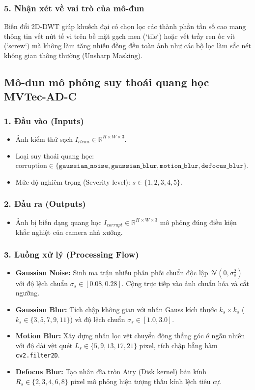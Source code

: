 \subsubsection*{5. Nhận xét về vai trò của mô-đun}
Biến đổi 2D-DWT giúp khuếch đại có chọn lọc các thành phần tần số cao mang thông tin vết nứt tế vi trên bề mặt gạch men (`tile`) hoặc vết trầy ren ốc vít (`screw`) mà không làm tăng nhiễu đồng đều toàn ảnh như các bộ lọc làm sắc nét không gian thông thường (Unsharp Masking).

\subsection{Mô-đun mô phỏng suy thoái quang học MVTec-AD-C}

\subsubsection*{1. Đầu vào (Inputs)}
\begin{itemize}
    \item Ảnh kiểm thử sạch $I_{clean} \in \mathbb{R}^{H \times W \times 3}$.
    \item Loại suy thoái quang học: $\text{corruption} \in \{\texttt{gaussian\_noise}, \texttt{gaussian\_blur}, \texttt{motion\_blur}, \texttt{defocus\_blur}\}$.
    \item Mức độ nghiêm trọng (Severity level): $s \in \{1, 2, 3, 4, 5\}$.
\end{itemize}

\subsubsection*{2. Đầu ra (Outputs)}
\begin{itemize}
    \item Ảnh bị biến dạng quang học $I_{corrupt} \in \mathbb{R}^{H \times W \times 3}$ mô phỏng đúng điều kiện khắc nghiệt của camera nhà xưởng.
\end{itemize}

\subsubsection*{3. Luồng xử lý (Processing Flow)}
\begin{itemize}
    \item \textbf{Gaussian Noise:} Sinh ma trận nhiễu phân phối chuẩn độc lập $\mathcal{N}(0, \sigma_s^2)$ với độ lệch chuẩn $\sigma_s \in [0.08, 0.28]$. Cộng trực tiếp vào ảnh chuẩn hóa và cắt ngưỡng.
    \item \textbf{Gaussian Blur:} Tích chập không gian với nhân Gauss kích thước $k_s \times k_s$ ($k_s \in \{3, 5, 7, 9, 11\}$) và độ lệch chuẩn $\sigma_s \in [1.0, 3.0]$.
    \item \textbf{Motion Blur:} Xây dựng nhân lọc vệt chuyển động thẳng góc $\theta$ ngẫu nhiên với độ dài vệt quét $L_s \in \{5, 9, 13, 17, 21\}$ pixel, tích chập bằng hàm \texttt{cv2.filter2D}.
    \item \textbf{Defocus Blur:} Tạo nhân đĩa tròn Airy (Disk kernel) bán kính $R_s \in \{2, 3, 4, 6, 8\}$ pixel mô phỏng hiện tượng thấu kính lệch tiêu cự.
\end{itemize}


